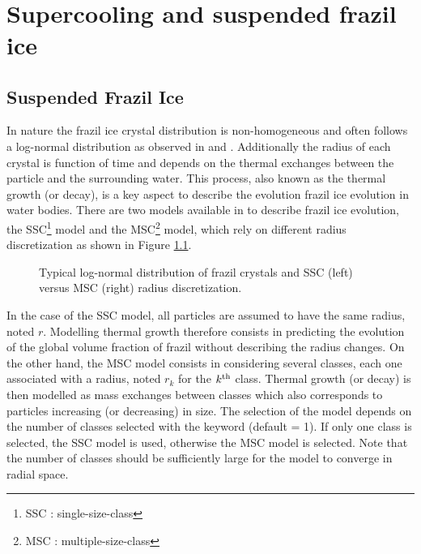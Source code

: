  \renewcommand{\labelitemi}{$\rhd$}

~\newline
\chapter{Supercooling and suspended frazil ice}
\label{chapter:tracers}

\section{Suspended Frazil Ice}

In nature the frazil ice crystal distribution is non-homogeneous and often follows a log-normal distribution
as observed in \cite{clark_2006} and \cite{macfarlane_2017}. Additionally the radius of each crystal is function of time
and depends on the thermal exchanges between the particle and the surrounding water.
This process, also known as the thermal growth (or decay), is a key aspect to describe the evolution frazil ice
evolution in water bodies.
There are two models available in \khione to describe frazil ice evolution, the SSC\footnote{SSC : single-size-class} model
and the MSC\footnote{MSC : multiple-size-class} model, which rely on different radius discretization as shown in Figure \ref{fig:radius_discretization}.

\begin{figure}[H]
    \begin{center}
    \end{center}
    \caption{Typical log-normal distribution of frazil crystals and SSC (left) versus MSC (right) radius discretization.}
    \label{fig:radius_discretization}
\end{figure}

In the case of the SSC model, all particles are assumed to have the same radius, noted $r$.
Modelling thermal growth therefore consists in predicting the evolution of the global volume fraction of frazil without
describing the radius changes.
On the other hand, the MSC model consists in considering several classes, each one associated with a radius, noted $r_k$ for the $k^{\rm{th}}$ class.
Thermal growth (or decay) is then modelled as mass exchanges between classes which also corresponds to particles increasing (or decreasing) in size.
The selection of the model depends on the number of classes selected with the keyword
 (default = 1). If only one class is selected, the SSC model is used,
otherwise the MSC model is selected.
Note that the number of classes should be sufficiently large for the model to converge in radial space.

